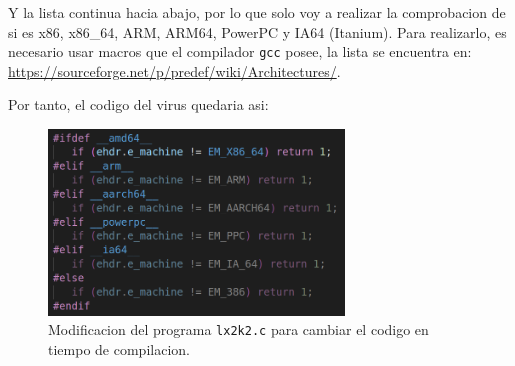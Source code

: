 \documentclass{article}
\begin{document}
Y la lista continua hacia abajo, por lo que solo voy a realizar la comprobacion de si es x86, x86\_64, ARM, ARM64, PowerPC y IA64 (Itanium). Para realizarlo, es necesario usar macros que el compilador \verb|gcc| posee, la lista se encuentra en: \url{https://sourceforge.net/p/predef/wiki/Architectures/}.

Por tanto, el codigo del virus quedaria asi:

\begin{figure}[H]
    \centering
    \includegraphics[width=0.7\textwidth]{imagenes/Captura desde 2022-11-25 17-21-11.png}
    \caption{Modificacion del programa \texttt{lx2k2.c} para cambiar el codigo en tiempo de compilacion.}
\end{figure}
\end{document}

